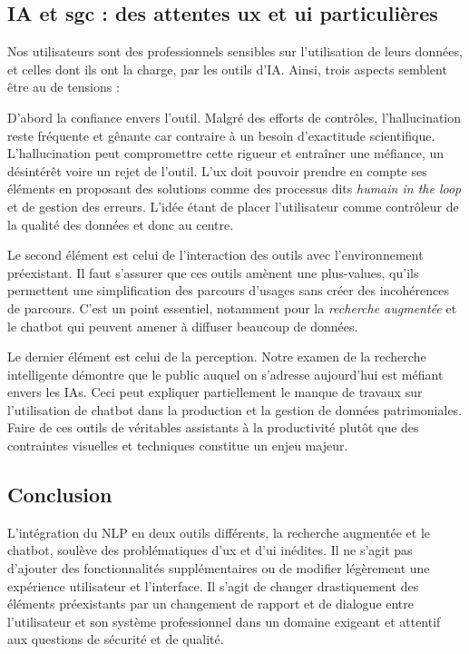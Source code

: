 \subsection{\gls{IA} et \gls{sgc} : des attentes \gls{ux} et \gls{ui} particulières}

Nos utilisateurs sont des professionnels sensibles sur l'utilisation de leurs données, et celles dont ils ont la charge, par les outils d'\gls{IA}. Ainsi, trois aspects semblent être au \coeur de tensions :

D'abord la confiance envers l'outil. Malgré des efforts de contrôles, l'hallucination reste fréquente et gênante car contraire à un besoin d'exactitude scientifique. L'hallucination peut compromettre cette rigueur et entraîner une méfiance, un désintérêt voire un rejet de l'outil. L'\gls{ux} doit pouvoir prendre en compte ses éléments en proposant des solutions comme des processus dits \textit{humain in the loop} et de gestion des erreurs. L'idée étant de placer l'utilisateur comme contrôleur de la qualité des données et donc au centre. 

Le second élément est celui de l'interaction des outils avec l'environnement préexistant. Il faut s'assurer que ces outils amènent une plus-values, qu'ils permettent une simplification des parcours d'usages sans créer des incohérences de parcours. C'est un point essentiel, notamment pour la \textit{recherche augmentée} et le \gls{chatbot} qui peuvent amener à diffuser beaucoup de données.

Le dernier élément est celui de la perception. Notre examen de la recherche intelligente démontre que le public auquel on s'adresse aujourd'hui est méfiant envers les \glspl{IA}. Ceci peut expliquer partiellement le manque de travaux sur l'utilisation de \gls{chatbot} dans la production et la gestion de données patrimoniales. Faire de ces outils de véritables assistants à la productivité plutôt que des contraintes visuelles et techniques constitue un enjeu majeur.

\subsection{Conclusion}

L'intégration du \gls{NLP} en deux outils différents, la recherche augmentée et le \gls{chatbot}, soulève des problématiques d'\gls{ux} et d'\gls{ui} inédites. Il ne s'agit pas d'ajouter des fonctionnalités supplémentaires ou de modifier légèrement une expérience utilisateur et l'interface. Il s'agit de changer drastiquement des éléments préexistants par un changement de rapport et de dialogue entre l'utilisateur et son système professionnel dans un domaine exigeant et attentif aux questions de sécurité et de qualité. 

